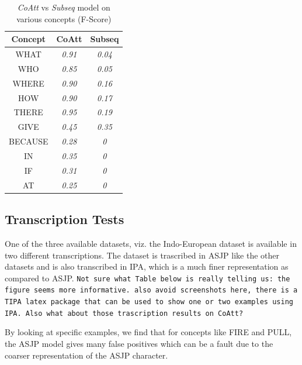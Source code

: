\documentclass[11pt,letterpaper]{article}
\begin{document}
\begin{table}[h]
\centering
\begin{tabular}{ccc}
\textbf{Concept} & \textbf{CoAtt} & \textbf{Subseq} \\ \hline
WHAT             & \textit{0.91}  & \textit{0.04}   \\
WHO              & \textit{0.85}  & \textit{0.05}   \\
WHERE            & \textit{0.90}  & \textit{0.16}   \\
HOW              & \textit{0.90}  & \textit{0.17}   \\
THERE            & \textit{0.95}  & \textit{0.19}  \\
GIVE             & \textit{0.45}  & \textit{0.35}  \\
BECAUSE          & \textit{0.28}  & \textit{0}      \\
IN               & \textit{0.35}  & \textit{0}      \\
IF               & \textit{0.31}  & \textit{0}      \\
AT               & \textit{0.25}  & \textit{0}      
\end{tabular}
\caption{\textit{CoAtt} vs \textit{Subseq} model on various concepts (F-Score)}
\end{table}

\subsection{Transcription Tests}

One of the three available datasets, viz. the Indo-European dataset is available in two different transcriptions. The dataset is trascribed in ASJP like the other datasets and is also transcribed in IPA, which is a much finer representation as compared to ASJP. 
\texttt{Not sure what Table below is really telling us: the figure seems more informative. also avoid screenshots here, there is a TIPA latex package that can be used to show one or two examples using IPA. Also what about those trascription results on CoAtt? }

By looking at specific examples, we find that for concepts like FIRE and PULL, the ASJP model gives many false positives which can be a fault due to the coarser representation of the ASJP character.
\end{document}
